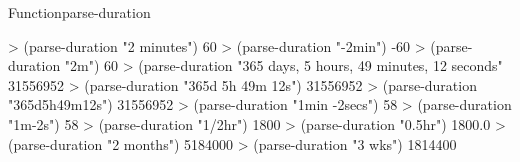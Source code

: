 \documentclass[10pt,twoside,english,pdftex]{article}
\begin{document}
\begin{functiondoc}{Function}{parse-duration}{%
    }
\fnexamples
%
\W\supp
\begin{example}
  > (parse-duration "2 minutes")
  60
  > (parse-duration "-2min")
  -60
  > (parse-duration "2m")
  60\goodpagebreak
  > (parse-duration "365 days, 5 hours, 49 minutes, 12 seconds"
  31556952
  > (parse-duration "365d 5h 49m 12s")
  31556952
  > (parse-duration "365d5h49m12s")
  31556952\goodpagebreak
  > (parse-duration "1min -2secs")
  58
  > (parse-duration "1m-2s")
  58\goodpagebreak
  > (parse-duration "1/2hr")
  1800
  > (parse-duration "0.5hr")
  1800.0\goodpagebreak
  > (parse-duration "2 months")
  5184000
  > (parse-duration "3 wks")
  1814400
\end{example}

\end{functiondoc}

\end{document}
